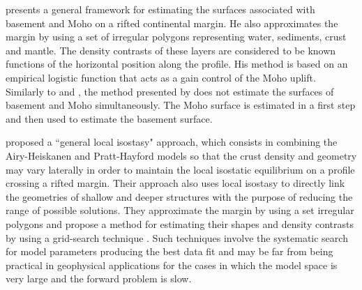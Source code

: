 \documentclass[manuscript]{geophysics}
\begin{document}
\citet{salem2017} presents a general framework for estimating the surfaces associated with
basement and Moho on a rifted continental margin.
He also approximates the margin by using a set of irregular polygons
representing water, sediments, crust and mantle.
The density contrasts of these layers are considered to be known functions
of the horizontal position along the profile.
His method is based on an empirical logistic function that acts as a gain control of the 
Moho uplift.
Similarly to \citet{salem-etal2014} and \citet{garcia-abdeslem2017}, the method presented
by \citet{salem2017} does not estimate the surfaces of basement and Moho simultaneously.
The Moho surface is estimated in a first step and then used to estimate the basement surface.

\citet{ferderer-etal2017} proposed a ``general local isostasy" approach, which consists
in combining the Airy-Heiskanen and Pratt-Hayford models \citep{heiskanen-moritz1967} 
so that the crust density and geometry 
may vary laterally in order to maintain the local isostatic equilibrium on a profile crossing
a rifted margin. Their approach also uses local isostasy to directly link the geometries
of shallow and deeper structures with the purpose of reducing the range of possible solutions.
They approximate the margin by using a set irregular polygons and propose a method 
for estimating their shapes and density contrasts by using a 
grid-search technique \citep{sen-stoffa2013}.
Such techniques involve the systematic search for model parameters producing the best data fit
and may be far from being practical in geophysical applications for the cases in which
the model space is very large and the forward problem is slow.
\end{document}
